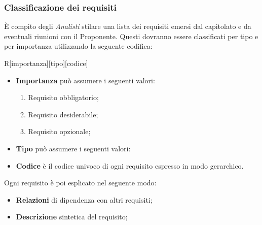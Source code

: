     \subsubsection{Classificazione dei requisiti}
      È compito degli \emph{Analisti} stilare una lista dei requisiti emersi dal capitolato e da eventuali riunioni con il Proponente. Questi dovranno essere
      classificati per tipo e per importanza utilizzando la seguente codifica:
      \begin{center}
        R[importanza][tipo][codice]
      \end{center}
      \begin{itemize}
        \item \textbf{Importanza} può assumere i seguenti valori:
          \bgroup
            \begin{enumerate}
              \item Requisito obbligatorio;
              \item Requisito desiderabile;
              \item Requisito opzionale;
            \end{enumerate}
          \egroup
        \item \textbf{Tipo} può assumere i seguenti valori:
          \bgroup
          \egroup
        \item \textbf{Codice} è il codice univoco di ogni requisito espresso in modo gerarchico.
      \end{itemize}
      Ogni requisito è poi esplicato nel seguente modo:
      \begin{itemize}
        \item \textbf{Relazioni} di dipendenza con altri requisiti;
        \item \textbf{Descrizione} sintetica del requisito;
      \end{itemize}
